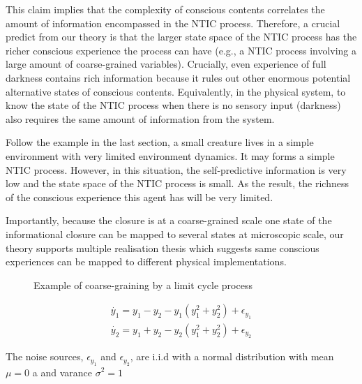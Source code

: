 \documentclass[utf8]{article}
\begin{document}
        This claim implies that the complexity of conscious contents correlates the amount of information encompassed in the NTIC process. Therefore, a crucial predict from our theory is that the larger state space of the NTIC process has the richer  conscious experience the process can have (e.g., a NTIC process involving a large amount of coarse-grained variables). Crucially, even experience of full darkness contains rich information because it rules out other enormous potential alternative states of conscious contents. Equivalently, in the physical system, to know the state of the NTIC process when there is no sensory input (darkness) also requires the same amount of information from the system. 
        
        Follow the example in the last section, a small creature lives in a simple environment with very limited environment dynamics. It may forms a simple NTIC process. However, in this situation, the self-predictive information is very low and the state space of the NTIC process is small. As the result, the richness of the conscious experience this agent has will be very limited. 
        
        Importantly, because the closure is at a coarse-grained scale one state of the informational closure can be mapped to several states at microscopic scale, our theory supports multiple realisation thesis  which suggests same conscious experiences can be mapped to different physical implementations. 
        
		\begin{figure}[H]
			\label{fig:limitCycle}
			\caption{Example of coarse-graining by a limit cycle process}
		\end{figure}
		

		\begin{equation}\label{eq:LimitCycleExample}
            \begin{array}{l}{\dot{y_1}=y_1-y_2-y_1\left(y_1^{2}+y_2^{2} \right)+\epsilon_{y_1}} \\ {\dot{y_2}=y_1+y_2-y_2\left(y_1^{2}+y_2^{2}\right)+\epsilon_{y_2}}\end{array}
		\end{equation}    		
		
		The noise sources, $\epsilon_{y_1}$ and $\epsilon_{y_2}$, are i.i.d with a normal distribution with mean $\mu=0$ a and varance $\sigma^{2}=1$     
		
\end{document}
